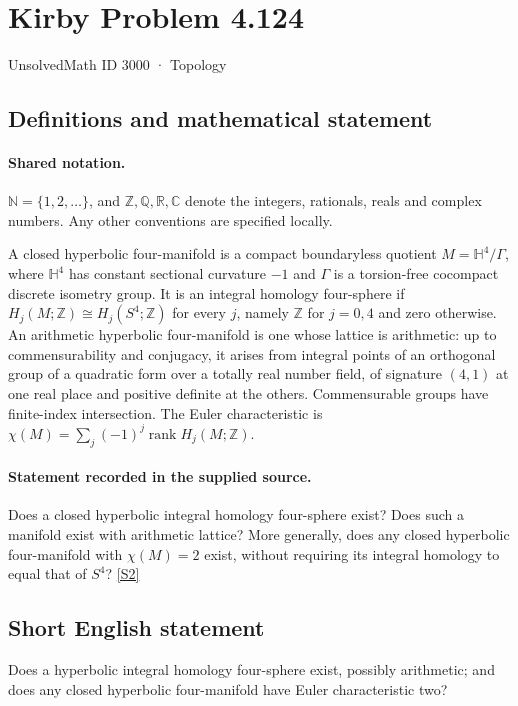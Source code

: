 \documentclass[11pt]{article}
\newcommand{\sref}[2]{\hyperlink{source:#1:#2}{[S#2]}}
\begin{document}
\setcounter{section}{2999}
\section{Kirby Problem 4.124}\label{3000}
{\small\sffamily UnsolvedMath ID 3000 · Topology}
\subsection{Definitions and mathematical statement}

\paragraph{Shared notation.}$\mathbb N=\{1,2,\ldots\}$, and $\mathbb Z,\mathbb Q,\mathbb R,\mathbb C$ denote the integers, rationals, reals and complex numbers. Any other conventions are specified locally.


A closed hyperbolic four-manifold is a compact boundaryless quotient $M=\mathbb H^4/\Gamma$, where $\mathbb H^4$ has constant sectional curvature $-1$ and $\Gamma$ is a torsion-free cocompact discrete isometry group. It is an integral homology four-sphere if $H_j(M;\mathbb Z)\cong H_j(S^4;\mathbb Z)$ for every $j$, namely $\mathbb Z$ for $j=0,4$ and zero otherwise. An arithmetic hyperbolic four-manifold is one whose lattice is arithmetic: up to commensurability and conjugacy, it arises from integral points of an orthogonal group of a quadratic form over a totally real number field, of signature $(4,1)$ at one real place and positive definite at the others. Commensurable groups have finite-index intersection. The Euler characteristic is $\chi(M)=\sum_j(-1)^j\operatorname{rank}H_j(M;\mathbb Z)$.
\paragraph{Statement recorded in the supplied source.}
Does a closed hyperbolic integral homology four-sphere exist? Does such a manifold exist with arithmetic lattice? More generally, does any closed hyperbolic four-manifold with $\chi(M)=2$ exist, without requiring its integral homology to equal that of $S^4$? \sref{3000}{2}
\subsection{Short English statement}
Does a hyperbolic integral homology four-sphere exist, possibly arithmetic; and does any closed hyperbolic four-manifold have Euler characteristic two?
\end{document}
